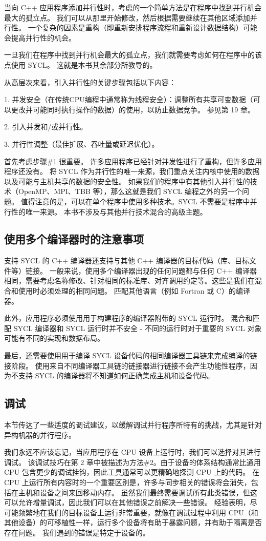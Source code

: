 当向 C++ 应用程序添加并行性时，考虑的一个简单方法是在程序中找到并行机会最大的孤立点。 我们可以从那里开始修改，然后根据需要继续在其他区域添加并行性。 一个复杂的因素是重构（即重新安排程序流程和重新设计数据结构）可能会提高并行性的机会。

一旦我们在程序中找到并行机会最大的孤立点，我们就需要考虑如何在程序中的该点使用 SYCL。 这就是本书其余部分所教导的。

从高层次来看，引入并行性的关键步骤包括以下内容：

1. 并发安全（在传统CPU编程中通常称为线程安全）：调整所有共享可变数据（可以更改并可能同时执行操作的数据）的使用，以防止数据竞争。 参见第 19 章。

2. 引入并发和/或并行性。

3. 并行性调整（最佳扩展、吞吐量或延迟优化）。

首先考虑步骤\#1 很重要。 许多应用程序已经针对并发性进行了重构，但许多应用程序还没有。 将 SYCL 作为并行性的唯一来源，我们重点关注内核中使用的数据以及可能与主机共享的数据的安全性。 如果我们的程序中有其他引入并行性的技术（OpenMP、MPI、TBB 等），那么这就是我们 SYCL 编程之外的另一个问题。 值得注意的是，可以在单个程序中使用多种技术。SYCL 不需要是程序中并行性的唯一来源。 本书不涉及与其他并行技术混合的高级主题。

\subsection{使用多个编译器时的注意事项}
支持 SYCL 的 C++ 编译器还支持与其他 C++ 编译器的目标代码（库、目标文件等）链接。 一般来说，使用多个编译器出现的任何问题都与任何 C++ 编译器相同，需要考虑名称修改、针对相同的标准库、对齐调用约定等。这些是我们在混合和使用时必须处理的相同问题。 匹配其他语言（例如 Fortran 或 C）的编译器。

此外，应用程序必须使用用于构建程序的编译器附带的 SYCL 运行时。 混合和匹配 SYCL 编译器和 SYCL 运行时并不安全 - 不同的运行时对于重要的 SYCL 对象可能有不同的实现和数据布局。

最后，还需要使用用于编译 SYCL 设备代码的相同编译器工具链来完成编译的链接阶段。 使用来自不同编译器工具链的链接器进行链接不会产生功能性程序，因为不支持 SYCL 的编译器将不知道如何正确集成主机和设备代码。

\subsection{调试}
本节传达了一些适度的调试建议，以缓解调试并行程序所特有的挑战，尤其是针对异构机器的并行程序。

我们永远不应该忘记，当应用程序在 CPU 设备上运行时，我们可以选择对其进行调试。 该调试技巧在第 2 章中被描述为方法\#2。由于设备的体系结构通常比通用 CPU 包含更少的调试挂钩，因此工具通常可以更精确地探测 CPU 上的代码。 在 CPU 上运行所有内容时的一个重要区别是，许多与同步相关的错误将会消失，包括在主机和设备之间来回移动内存。 虽然我们最终需要调试所有此类错误，但这可以允许增量调试，因此我们可以在其他错误之前解决一些错误。 经验表明，尽可能频繁地在我们的目标设备上运行非常重要，就像在调试过程中利用 CPU（和其他设备）的可移植性一样，运行多个设备将有助于暴露问题，并有助于隔离是否存在问题。 我们遇到的错误是特定于设备的。

